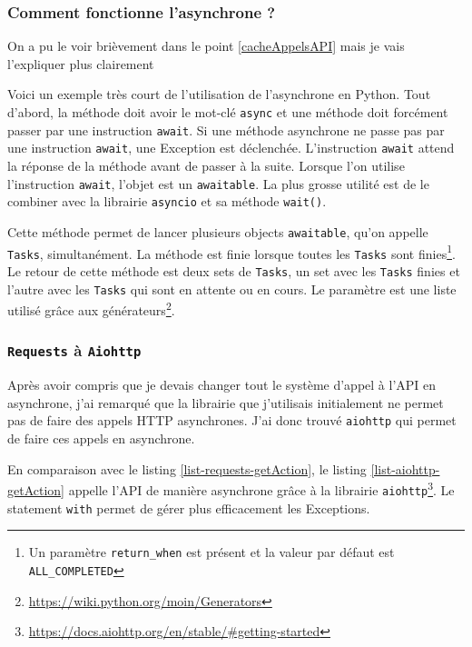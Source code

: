 \documentclass[a4paper,14pt]{extarticle}
\begin{document}
{\subsubsection{Comment fonctionne l'asynchrone ?}

On a pu le voir brièvement dans le point \ref{cacheAppelsAPI} mais je vais l'expliquer plus clairement


Voici un exemple très court de l'utilisation de l'asynchrone en Python. Tout d'abord, la méthode doit avoir le mot-clé \texttt{async} et une méthode doit forcément passer par une instruction \texttt{await}. Si une méthode asynchrone ne passe pas par une instruction \texttt{await}, une Exception est déclenchée. L'instruction \texttt{await} attend la réponse de la méthode avant de passer à la suite. Lorsque l'on utilise l'instruction \texttt{await}, l'objet est un \texttt{awaitable}.
La plus grosse utilité est de le combiner avec la librairie \texttt{asyncio} et sa méthode \texttt{wait()}.


Cette méthode permet de lancer plusieurs objects \texttt{awaitable}, qu'on appelle \texttt{Tasks}, simultanément. La méthode est finie lorsque toutes les \texttt{Tasks} sont finies\footnote{Un paramètre \texttt{return\_when} est présent et la valeur par défaut est \texttt{ALL\_COMPLETED}}. Le retour de cette méthode est deux sets de \texttt{Tasks}, un set avec les \texttt{Tasks} finies et l'autre avec les \texttt{Tasks} qui sont en attente ou en cours. Le paramètre est une liste utilisé grâce aux générateurs\footnote{\url{https://wiki.python.org/moin/Generators}}. 

\subsubsection{\texttt{Requests} à \texttt{Aiohttp}}

Après avoir compris que je devais changer tout le système d'appel à l'API en asynchrone, j'ai remarqué que la librairie que j'utilisais initialement ne permet pas de faire des appels HTTP asynchrones. J'ai donc trouvé \texttt{aiohttp} qui permet de faire ces appels en asynchrone.


En comparaison avec le listing \ref{list-requests-getAction}, le listing \ref{list-aiohttp-getAction} appelle l'API de manière asynchrone grâce à la librairie \texttt{aiohttp}\footnote{\url{https://docs.aiohttp.org/en/stable/\#getting-started}}. Le statement \texttt{with} permet de gérer plus efficacement les Exceptions.

}
\end{document}
